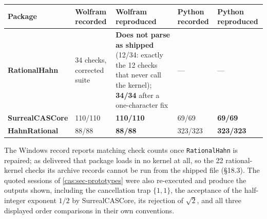 \documentclass[11pt,letterpaper]{article}
\numberwithin{equation}{section}
\theoremstyle{definition}
\theoremstyle{remark}
\begin{document}
\begingroup\small
\begin{longtable}{@{}P{0.19\textwidth}P{0.17\textwidth}P{0.24\textwidth}P{0.13\textwidth}P{0.14\textwidth}@{}}
\toprule
Package & Wolfram recorded & Wolfram reproduced & Python recorded &
Python reproduced\\
\midrule\endhead
\textbf{RationalHahn} & 34 checks, corrected suite &
\textbf{Does not parse as shipped} (12/34: exactly the 12
checks that never call the kernel); \textbf{34/34} after a
one-character fix &
--- & ---\\[0.45em]
\textbf{SurrealCASCore} & 110/110 & \textbf{110/110} & 69/69 &
\textbf{69/69}\\[0.45em]
\textbf{HahnRational} & 88/88 & \textbf{88/88} & 323/323 &
\textbf{323/323}\\
\bottomrule
\end{longtable}
\endgroup

The Windows record reports matching check counts once
\texttt{RationalHahn} is repaired; as delivered that package loads in no
kernel at all, so the 22 rational-kernel checks its archive records cannot be
run from the shipped file (\S18.3). The quoted sessions of
\cref{cas:sec-prototypes} were also re-executed and produce the outputs shown,
including the cancellation trap $\{1,1\}$, the acceptance of the half-integer
exponent $1/2$ by SurrealCASCore, its rejection of $\sqrt2$, and all three
displayed order comparisons in their own conventions.
\end{document}
